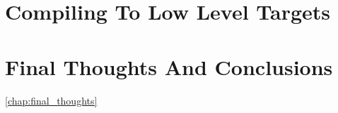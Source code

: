 \chapter{Compiling To Low Level Targets}




\chapter{Final Thoughts And Conclusions}
\ref{chap:final_thoughts}

%

\listoffigures
\listoftables
{}
\nocite{*}
\printbibliography[heading=bibintoc]

